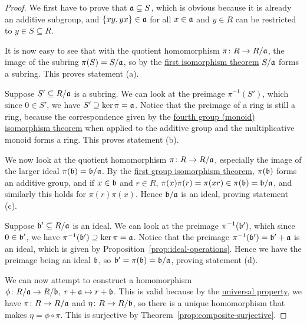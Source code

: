 \begin{proof}
    We first have to prove that \(\mathfrak{a} \subseteq S\),
    which is obvious because it is already an additive subgroup,
    and \(\{xy,yx\} \in \mathfrak{a}\) for all \(x \in \mathfrak{a}\) and \(y \in R\)
    can be restricted to \(y \in S \subseteq R\).

    It is now easy to see that
    with the quotient homomorphism \(\pi\colon R\to R/\mathfrak{a}\),
    the image of the subring \(\pi(S) = S/\mathfrak{a}\),
    so by the \hyperref[thm:iso-1-group]{first isomorphism theorem}
    \(S/\mathfrak{a}\) forms a subring.
    This proves statement (a).

    \medskip

    Suppose \(S' \subseteq R/\mathfrak{a}\) is a subring.
    We can look at the preimage \(\pi^{-1}(S')\),
    which since \(0 \in S'\), we have \(S' \supseteq \ker\pi = \mathfrak{a}\).
    Notice that the preimage of a ring is still a ring,
    because the correspondence given by
    the \hyperref[thm:iso-4-group]{fourth group (monoid) isomorphism theorem}
    when applied to the additive group and the multiplicative monoid
    forms a ring.
    This proves statement (b).

    \medskip

    We now look at the quotient homomorphism \(\pi\colon R\to R/\mathfrak{a}\),
    especially the image of the larger ideal \(\pi(\mathfrak{b}) = \mathfrak{b/a}\).
    By the \hyperref[thm:iso-1-group]{first group isomorphism theorem},
    \(\pi(\mathfrak{b})\) forms an additive group,
    and if \(x \in \mathfrak{b}\) and \(r \in R\),
    \(\pi(x)\pi(r) = \pi(xr) \in \pi(\mathfrak{b}) = \mathfrak{b/a}\),
    and similarly this holds for \(\pi(r)\pi(x)\).
    Hence \(\mathfrak{b/a}\) is an ideal, proving statement (c).

    \medskip

    Suppose \(\mathfrak{b'} \subseteq R/\mathfrak{a}\) is an ideal.
    We can look at the preimage \(\pi^{-1}(\mathfrak{b'})\),
    which since \(0 \in \mathfrak{b'}\), we have \(\pi^{-1}(\mathfrak{b'}) \supseteq \ker\pi = \mathfrak{a}\).
    Notice that the preimage \(\pi^{-1}(\mathfrak{b'}) = \mathfrak{b'} + \mathfrak{a}\) is an ideal,
    which is given by Proposition~\ref{prop:ideal-operations}.
    Hence we have the preimage being an ideal \(\mathfrak{b}\),
    so \(\mathfrak{b'} = \pi(\mathfrak{b}) = \mathfrak{b/a}\),
    proving statement (d).

    \medskip

    We can now attempt to construct a homomorphism
    \(\phi\colon R/\mathfrak{a}\to R/\mathfrak{b},\;r+\mathfrak{a}\mapsto r+\mathfrak{b}\).
    This is valid because
    by the \hyperref[thm:univ-prop-quotient-ring]{universal property},
    we have \(\pi\colon R\to R/\mathfrak{a}\) and \(\eta\colon R\to R/\mathfrak{b}\),
    so there is a unique homomorphism that makes \(\eta = \phi\circ\pi\).
    This is surjective by Theorem~\ref{prop:composite-surjective}.


\end{proof}
